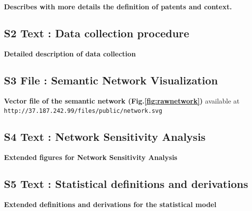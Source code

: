 \documentclass[12pt,twoside,a4paper]{article}
\begin{document}
\textbf{Describes with more details the definition of patents and  context.}

\subsection*{S2 Text : Data collection procedure}

\textbf{Detailed description of data collection}

\subsection*{S3 File : Semantic Network Visualization}

\textbf{Vector file of the semantic network (Fig.\ref{fig:rawnetwork})} available at \texttt{http://37.187.242.99/files/public/network.svg}


\subsection*{S4 Text : Network Sensitivity Analysis\label{app:sensitivity}}

\textbf{Extended figures for Network Sensitivity Analysis}

\subsection*{S5 Text : Statistical definitions and derivations}

\textbf{Extended definitions and derivations for the statistical model}









%
%
% 
\end{document}
